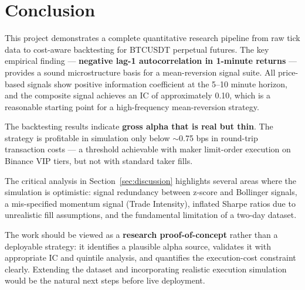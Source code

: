 \documentclass[11pt, a4paper]{article}
\begin{document}
\section{Conclusion}

This project demonstrates a complete quantitative research pipeline from raw
tick data to cost-aware backtesting for BTCUSDT perpetual futures.
The key empirical finding --- \textbf{negative lag-1 autocorrelation in 1-minute
returns} --- provides a sound microstructure basis for a mean-reversion signal
suite.  All price-based signals show positive information coefficient at the
5--10 minute horizon, and the composite signal achieves an IC of approximately
0.10, which is a reasonable starting point for a high-frequency mean-reversion
strategy.

The backtesting results indicate \textbf{gross alpha that is real but thin}.
The strategy is profitable in simulation only below $\sim$0.75 bps in round-trip
transaction costs --- a threshold achievable with maker limit-order execution
on Binance VIP tiers, but not with standard taker fills.

The critical analysis in Section~\ref{sec:discussion} highlights several areas
where the simulation is optimistic: signal redundancy between z-score and
Bollinger signals, a mis-specified momentum signal (Trade Intensity), inflated
Sharpe ratios due to unrealistic fill assumptions, and the fundamental limitation
of a two-day dataset.

The work should be viewed as a \textbf{research proof-of-concept} rather than
a deployable strategy: it identifies a plausible alpha source, validates it
with appropriate IC and quintile analysis, and quantifies the execution-cost
constraint clearly.  Extending the dataset and incorporating realistic execution
simulation would be the natural next steps before live deployment.
\end{document}
